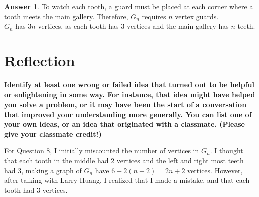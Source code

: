\documentclass[article, 12pt]{article}
\theoremstyle{definition}
\newtheorem{answer}{Answer}
\begin{document}
    \begin{answer}
        To watch each tooth, a guard must be placed at each corner where a tooth meets the main gallery. Therefore, $G_n$ requires $n$ vertex guards. 
        \\[12pt]
        $G_n$ has $3n$ vertices, as each tooth has 3 vertices and the main gallery has $n$ teeth.
    \end{answer}
    \section*{Reflection}
    \textbf{Identify at least one wrong or failed idea that turned out to be helpful or enlightening in some way. For instance, that idea might have helped you solve a problem, or it may have been the start of a conversation that improved your understanding more generally. You can list one of your own ideas, or an idea that originated with a classmate. (Please give your classmate credit!)}

    For Question 8, I initially miscounted the number of vertices in $G_n$. I thought that each tooth in the middle had 2 vertices and the left and right most teeth had 3, making a graph of $G_n$ have $6 + 2(n-2) = 2n + 2$ vertices. However, after talking with Larry Huang, I realized that I made a mistake, and that each tooth had 3 vertices.  
\end{document}
